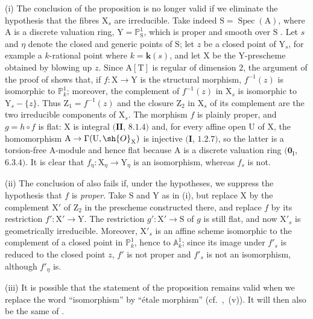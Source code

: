 \begin{remarks}[21.12.17]
\label{IV.21.12.17}
(i)
The conclusion of the proposition  is no longer valid if we eliminate the hypothesis that the fibres $\mathrm{X}_s$ are irreducible.
Take indeed $\mathrm{S}=\operatorname{Spec}(\mathrm{A})$, where $\mathrm{A}$ is a discrete valuation ring, $\mathrm{Y}=\mathbb{P}^1_{\mathrm{S}}$, which is proper and smooth over $\mathrm{S}$ .
Let $s$ and $\eta$ denote the closed and generic points of $\mathrm{S}$; let $z$ be a closed point of $\mathrm{Y}_s$, for example a $k$-rational point where $k=\boldsymbol{k}(s)$, and let $\mathrm{X}$ be the $\mathrm{Y}$-prescheme obtained by blowing up $z$.
Since $\mathrm{A}[\mathrm{T}]$ is regular of dimension $2$, the argument of the proof of  shows that, if $f:\mathrm{X}\to\mathrm{Y}$ is the structural morphism, $f^{-1}(z)$ is isomorphic to $\mathbb{P}^1_k$; moreover, the complement of $f^{-1}(z)$ in $\mathrm{X}_s$ is isomorphic to $\mathrm{Y}_s-\{z\}$.  Thus $\mathrm{Z}_1=f^{-1}(z)$ and the closure $\mathrm{Z}_2$ in $\mathrm{X}_s$ of its complement are the two irreducible components of $\mathrm{X}_s$.
The morphism $f$ is plainly proper, and $g=h\circ f$ is flat: $\mathrm{X}$ is integral $(\mathbf{II}$, $8.1.4)$ and, for every affine open $\mathrm{U}$ of $\mathrm{X}$, the homomorphism $\mathrm{A}\to\Gamma(\mathrm{U},\sh{O}_{\mathrm{X}})$ is injective $(\mathbf{I}$, $1.2.7)$, so the latter is a torsion-free A-module and hence flat because $\mathrm{A}$ is a discrete valuation ring $(\mathbf{0}_{\mathrm{I}}$, $6.3.4)$.
It is clear that $f_\eta:\mathrm{X}_\eta\to\mathrm{Y}_\eta$ is an isomorphism, whereas $f_s$ is not.

(ii)
The conclusion of  also fails if, under the hypotheses, we suppress the hypothesis that $f$ is \emph{proper}.
Take $\mathrm{S}$ and $\mathrm{Y}$ as in (i), but replace $\mathrm{X}$ by the complement $\mathrm{X}'$ of $\mathrm{Z}_2$ in the prescheme constructed there, and replace $f$ by its restriction $f':\mathrm{X}'\to\mathrm{Y}$.  The restriction $g':\mathrm{X}'\to\mathrm{S}$ of $g$ is still flat, and now $\mathrm{X}'_s$ is geometrically irreducible.  Moreover, $\mathrm{X}'_s$ is an affine scheme isomorphic to the complement of a closed point in $\mathbb{P}^1_k$, hence to $\mathbb{A}^1_k$; since its image under $f'_s$ is reduced to the closed point $z$, $f'$ is not proper and $f'_s$ is not an isomorphism, although $f'_\eta$ is.

(iii)
It is possible that the statement of the proposition  remains valid when we replace the word ``isomorphism'' by ``\'etale morphism'' (cf.\ ,~(v)).
It will then also be the same of .
\end{remarks}

